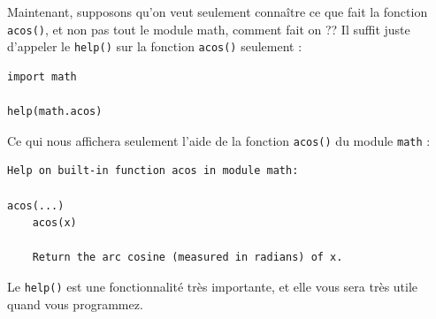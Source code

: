 \documentclass[12pt]{article}
\newcommand{\code}[1]{\colorbox{light-gray}{\texttt{#1}}}
\begin{document}
        Maintenant, supposons qu'on veut seulement connaître ce que fait la fonction \code{acos()}, et non pas tout 
        le module math, comment fait on ?? Il suffit juste d'appeler le \code{help()} sur la fonction \code{acos()}
        seulement :
        \begin{lstlisting}[style=code]
import math

help(math.acos) 
        \end{lstlisting}

        Ce qui nous affichera seulement l'aide de la fonction \code{acos()} du module \code{math} :
        \begin{lstlisting}[style=exec_result]
Help on built-in function acos in module math:

acos(...)
    acos(x)
    
    Return the arc cosine (measured in radians) of x.
        \end{lstlisting}

        Le \code{help()} est une fonctionnalité très importante, et elle vous sera très utile quand vous programmez.

        
\end{document}
